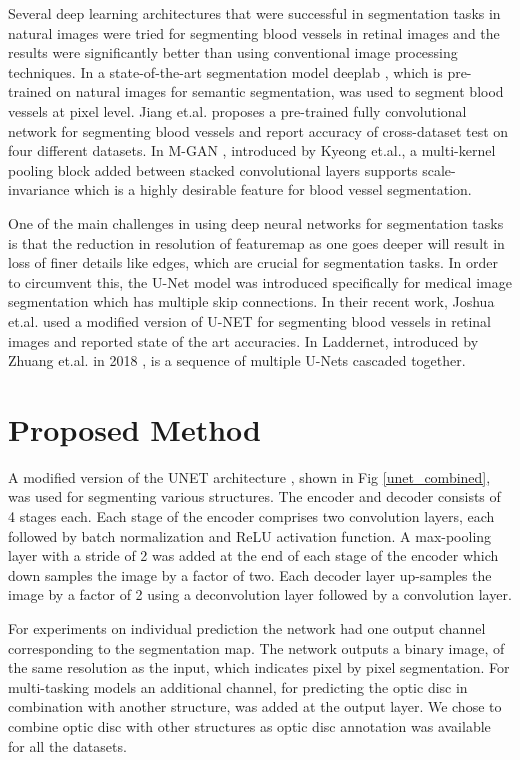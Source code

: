 \documentclass{article}
\begin{document}
Several deep learning architectures that were successful in segmentation tasks \cite{chen2017deeplab} in natural images were tried for segmenting blood vessels in retinal images and the results were significantly better than using conventional image processing techniques.
In \cite{vengalil2016customizing} a state-of-the-art segmentation model deeplab \cite{chen2017deeplab}, which is pre-trained on natural images  for semantic segmentation,  was used to segment blood vessels at pixel level.
Jiang et.al. proposes \cite {jiang2018retinal} a  pre-trained fully convolutional network for segmenting blood vessels and report accuracy of cross-dataset test on four different datasets.
In M-GAN \cite{park2020m}, introduced by Kyeong et.al., a multi-kernel pooling block added between stacked convolutional layers supports scale-invariance which is a highly desirable feature for blood vessel segmentation.

One of the main challenges in using deep neural networks for segmentation tasks is that the reduction in resolution of featuremap as one goes deeper will result in loss of finer details like edges, which are crucial for segmentation tasks.
In order to circumvent this, the U-Net \cite{ronneberger2015u} model was introduced specifically for medical image segmentation which has multiple skip connections.
In their recent work, Joshua et.al. \cite{joshua2020blood} used a modified version of U-NET for segmenting blood vessels in retinal images and reported state of the art accuracies.
In Laddernet, introduced by Zhuang et.al. in 2018 \cite{zhuang2018laddernet},  is a sequence of multiple U-Nets cascaded together.

\section{Proposed Method}
A modified version of the UNET architecture \cite{ronneberger2015u}, shown in Fig \ref{unet_combined}, was used for segmenting various structures.
The encoder and decoder consists of 4 stages each.
Each stage of the encoder comprises two convolution layers, each followed by batch normalization and ReLU activation function.
A max-pooling layer with a stride of 2 was added at the end of each stage of the encoder which down samples the image by a factor of two.
Each decoder layer up-samples the image by a factor of 2 using  a deconvolution layer followed by a convolution layer.

For experiments on individual prediction the network had one output channel corresponding to the segmentation map.
The network outputs a binary image, of the same resolution as the input,  which indicates pixel by pixel segmentation.
For multi-tasking models an additional channel, for predicting the optic disc in combination with another structure,  was added at the output layer.
We chose to combine optic disc with other structures as optic disc annotation was available for all the datasets.
\end{document}
